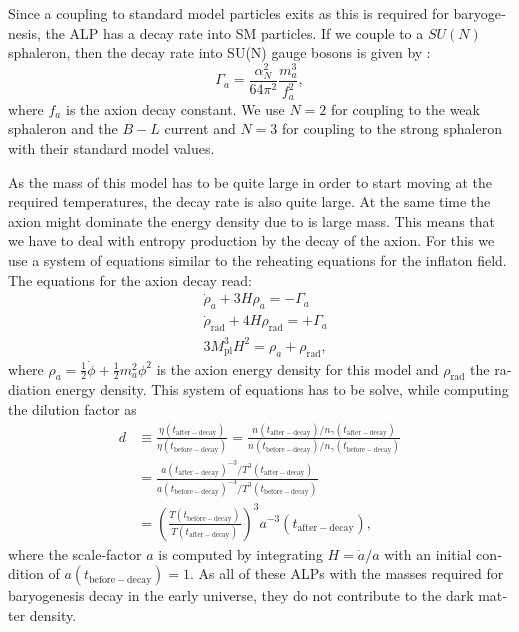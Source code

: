 \documentclass[master,       %
               twoside,        %
               BCOR10mm,       %
               english,ngerman, %
               ]{GAUBM}
\begin{document}
\begin{otherlanguage}{english}
\begin{figure}[H]
\end{figure}
Since a coupling to standard model particles exits as this is required for baryogenesis, the ALP has a decay rate into SM particles. If we couple to a $SU(N)$ sphaleron, then the decay rate into SU(N) gauge bosons is given by \cite[eq. 15]{Kusenko_2015_Axion_Leptogenesis}:
\begin{equation}
	\Gamma_a = \frac{\alpha_N^2}{64\pi^2} \frac{m_a^3}{f_a^2},
\end{equation}
where $f_a$ is the axion decay constant.
We use $N = 2$ for coupling to the weak sphaleron and the $B-L$ current and $N = 3$ for coupling to the strong sphaleron with their standard model values.

As the mass of this model has to be quite large in order to start moving at the required temperatures, the decay rate is also quite large.
At the same time the axion might dominate the energy density due to is large mass. This means that we have to deal with entropy production by the decay of the axion.
For this we use a system of equations similar to the reheating equations for the inflaton field. The equations for the axion decay read:
\begin{align}
	&\dot{\rho}_a + 3 H \rho_a = - \Gamma_a \nonumber \\
	&\dot{\rho}_\mathrm{rad} + 4 H \rho_\mathrm{rad} = + \Gamma_a \nonumber \\
	&3 M_\mathrm{pl}^3 H^2 = \rho_a + \rho_\mathrm{rad},
\end{align}
where $\rho_a = \frac{1}{2} \dot{\phi} + \frac{1}{2} m_a^2 \phi^2$ is the axion energy density for this model and $\rho_\mathrm{rad}$ the radiation energy density.
This system of equations has to be solve, while computing the dilution factor as
\begin{align}
	d &\equiv \frac{\eta(t_\mathrm{after-decay})}{\eta(t_\mathrm{before-decay})} = \frac{n(t_\mathrm{after-decay}) / n_\gamma(t_\mathrm{after-decay})}{n(t_\mathrm{before-decay}) / n_\gamma(t_\mathrm{before-decay})} \nonumber \\
	&= \frac{a(t_\mathrm{after-decay})^{-3} / T^3(t_\mathrm{after-decay})}{a(t_\mathrm{before-decay})^{-3} / T^3(t_\mathrm{before-decay})} \nonumber \\
	&= \left( \frac{T(t_\mathrm{before-decay})}{T(t_\mathrm{after-decay})} \right)^3 a^{-3}(t_\mathrm{after-decay}),
\end{align}
where the scale-factor $a$ is computed by integrating $H = \dot{a} / a$ with an initial condition of $a(t_\mathrm{before-decay}) = 1$.
As all of these ALPs with the masses required for baryogenesis decay in the early universe, they do not contribute to the dark matter density.


\end{otherlanguage}
\end{document}
